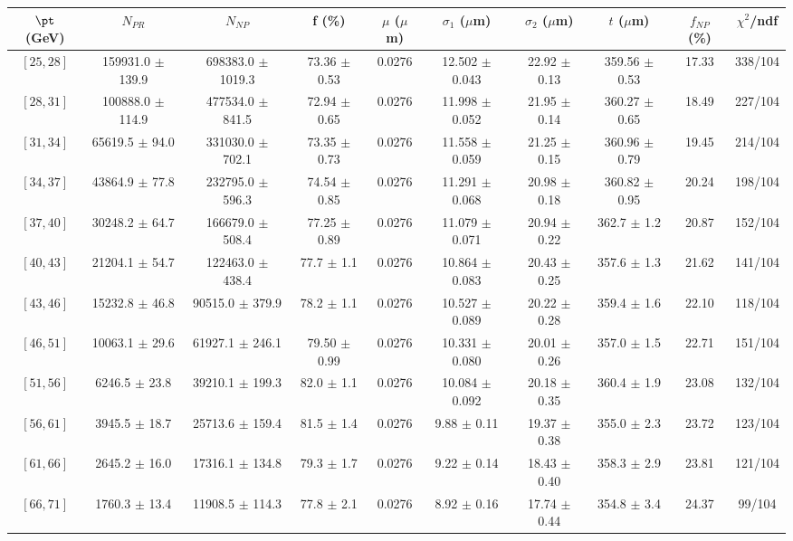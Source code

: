 \begin{tabular}{c||c|c|c|c|c|c|c||c|c}
$\pt$ (GeV) & $N_{PR}$ & $N_{NP}$ & f (\%) & $\mu$ ($\mu$m) & $\sigma_1$ ($\mu$m) & $\sigma_2$ ($\mu$m)  & $t$ ($\mu$m) & $f_{NP}$ (\%) & $\chi^2$/ndf \\
\hline
$[25, 28]$ & 159931.0 $\pm$ 139.9 & 698383.0 $\pm$ 1019.3 & 73.36 $\pm$ 0.53 & 0.0276 & 12.502 $\pm$ 0.043 & 22.92 $\pm$ 0.13 & 359.56 $\pm$ 0.53 & 17.33 & 338/104\\
$[28, 31]$ & 100888.0 $\pm$ 114.9 & 477534.0 $\pm$ 841.5 & 72.94 $\pm$ 0.65 & 0.0276 & 11.998 $\pm$ 0.052 & 21.95 $\pm$ 0.14 & 360.27 $\pm$ 0.65 & 18.49 & 227/104\\
$[31, 34]$ & 65619.5 $\pm$ 94.0 & 331030.0 $\pm$ 702.1 & 73.35 $\pm$ 0.73 & 0.0276 & 11.558 $\pm$ 0.059 & 21.25 $\pm$ 0.15 & 360.96 $\pm$ 0.79 & 19.45 & 214/104\\
$[34, 37]$ & 43864.9 $\pm$ 77.8 & 232795.0 $\pm$ 596.3 & 74.54 $\pm$ 0.85 & 0.0276 & 11.291 $\pm$ 0.068 & 20.98 $\pm$ 0.18 & 360.82 $\pm$ 0.95 & 20.24 & 198/104\\
$[37, 40]$ & 30248.2 $\pm$ 64.7 & 166679.0 $\pm$ 508.4 & 77.25 $\pm$ 0.89 & 0.0276 & 11.079 $\pm$ 0.071 & 20.94 $\pm$ 0.22 & 362.7 $\pm$ 1.2 & 20.87 & 152/104\\
$[40, 43]$ & 21204.1 $\pm$ 54.7 & 122463.0 $\pm$ 438.4 & 77.7 $\pm$ 1.1 & 0.0276 & 10.864 $\pm$ 0.083 & 20.43 $\pm$ 0.25 & 357.6 $\pm$ 1.3 & 21.62 & 141/104\\
$[43, 46]$ & 15232.8 $\pm$ 46.8 & 90515.0 $\pm$ 379.9 & 78.2 $\pm$ 1.1 & 0.0276 & 10.527 $\pm$ 0.089 & 20.22 $\pm$ 0.28 & 359.4 $\pm$ 1.6 & 22.10 & 118/104\\
$[46, 51]$ & 10063.1 $\pm$ 29.6 & 61927.1 $\pm$ 246.1 & 79.50 $\pm$ 0.99 & 0.0276 & 10.331 $\pm$ 0.080 & 20.01 $\pm$ 0.26 & 357.0 $\pm$ 1.5 & 22.71 & 151/104\\
$[51, 56]$ & 6246.5 $\pm$ 23.8 & 39210.1 $\pm$ 199.3 & 82.0 $\pm$ 1.1 & 0.0276 & 10.084 $\pm$ 0.092 & 20.18 $\pm$ 0.35 & 360.4 $\pm$ 1.9 & 23.08 & 132/104\\
$[56, 61]$ & 3945.5 $\pm$ 18.7 & 25713.6 $\pm$ 159.4 & 81.5 $\pm$ 1.4 & 0.0276 & 9.88 $\pm$ 0.11 & 19.37 $\pm$ 0.38 & 355.0 $\pm$ 2.3 & 23.72 & 123/104\\
$[61, 66]$ & 2645.2 $\pm$ 16.0 & 17316.1 $\pm$ 134.8 & 79.3 $\pm$ 1.7 & 0.0276 & 9.22 $\pm$ 0.14 & 18.43 $\pm$ 0.40 & 358.3 $\pm$ 2.9 & 23.81 & 121/104\\
$[66, 71]$ & 1760.3 $\pm$ 13.4 & 11908.5 $\pm$ 114.3 & 77.8 $\pm$ 2.1 & 0.0276 & 8.92 $\pm$ 0.16 & 17.74 $\pm$ 0.44 & 354.8 $\pm$ 3.4 & 24.37 & 99/104\\

\end{tabular}
